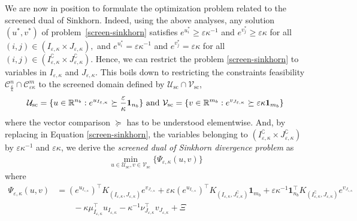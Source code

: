 {We are now in position to formulate the
optimization problem related to the screened dual of Sinkhorn.} Indeed, using the above analyses, any solution $(u^*, v^*)$ of problem~\eqref{screen-sinkhorn} satisfies $e^{u^*_i} \geq \varepsilon\kappa^{-1}$ and $e^{v^*_j} \geq \varepsilon\kappa$ for all $(i,j) \in (I_{\varepsilon,\kappa}\times J_{\varepsilon,\kappa}),$ and $e^{u^*_i} = \varepsilon\kappa^{-1}$ and $e^{v^*_j} = \varepsilon\kappa$ for all $(i,j) \in (I^\complement_{\varepsilon,\kappa}\times J^\complement_{\varepsilon,\kappa})$.
{Hence, we can restrict the problem \eqref{screen-sinkhorn} to 
variables in $I_{\varepsilon,\kappa}$ and $J_{\varepsilon,\kappa}$}. This boils down
to restricting the constraints feasibility $\mathcal{C}^n_{\frac \varepsilon \kappa} \cap \mathcal{C}^m_{\varepsilon\kappa}$ to the screened domain defined by $\mathcal{U}_{\text{sc}} \cap \mathcal{V}_{\text{sc}}$, 
\begin{equation*}
\mathcal{U}_{\text{sc}} = \{u \in \R^{n_b}: e^{u_{I_{\varepsilon,\kappa}}} \succeq \frac \varepsilon\kappa\mathbf 1_{n_b}\} \text{ and } \mathcal{V}_{\text{sc}} =\{v\in\R^{m_b}: e^{v_{J_{\varepsilon,\kappa}}} \succeq \varepsilon\kappa \mathbf{1}_{m_b}\}%
\end{equation*}
where the vector comparison $\succeq$ has to be understood elementwise. {And,
	  by replacing in Equation \eqref{screen-sinkhorn}, the variables belonging to $(I^\complement_{\varepsilon,\kappa}\times J^\complement_{\varepsilon,\kappa})$ by $\varepsilon\kappa^{-1}$ and
$\varepsilon\kappa$}, we derive the \emph{screened dual of Sinkhorn divergence problem} as
\begin{align}
\label{screen-sinkhorn_second_def}
\min_{u \in \mathcal{U}_{\text{sc}}, v \in \mathcal{V}_{\text{sc}}}\{\Psi_{\varepsilon, \kappa}(u,v)\}
\end{align}
where 
\begin{align*} 
\Psi_{\varepsilon,\kappa}(u, v) &= (e^{u_{I_{\varepsilon,\kappa}}})^\top K_{(I_{\varepsilon,\kappa}, J_{\varepsilon,\kappa})} e^{v_{J_{\varepsilon,\kappa}}} + 
\varepsilon \kappa (e^{u_{I_{\varepsilon,\kappa}}})^\top K_{(I_{\varepsilon,\kappa}, J^\complement_{\varepsilon,\kappa})}\mathbf 1_{m_b} + \varepsilon \kappa^{-1} \mathbf 1_{n_b}^\top K_{(I^\complement_{\varepsilon,\kappa}, J_{\varepsilon,\kappa})}e^{v_{J_{\varepsilon,\kappa}}}\\
&\qquad - \kappa \mu_{I_{\varepsilon,\kappa}}^\top u_{I_{\varepsilon,\kappa}} - \kappa^{-1} \nu_{J_{\varepsilon,\kappa}}^\top v_{J_{\varepsilon,\kappa}} + \Xi
\end{align*}
